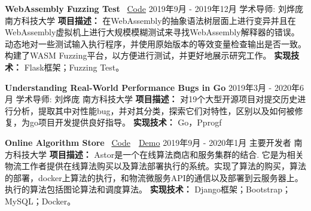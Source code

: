 \documentclass[10pt,a4paper]{article}
\begin{document}
\spacedhrule{1.6em}{-0.4em}



\headedsection
  {\textbf{WebAssembly Fuzzing Test} \faGithub~\href{https://github.com/Eveneko/WASM-Fuzzing-Platform}{Code}}
  {\textsc{2019年9月 - 2019年12月}} {%
  \prosubsection
    {学术导师: 刘烨庞}
    {南方科技大学}
    {
      \textbf{项目描述：}
      在WebAssembly的抽象语法树层面上进行变异并且在WebAssembly虚拟机上进行大规模模糊测试来寻找WebAssembly解释器的错误。动态地对一些测试输入执行程序，并使用原始版本的等效变量检查输出是否一致。构建了WASM Fuzzing平台，以方便进行测试，并更好地展示研究工作。
    }
    {
      \textbf{实现技术：}
      Flask框架；Fuzzing Test。
    }
}

\headedsection
  {\textbf{Understanding Real-World Performance Bugs in Go}}
  {\textsc{2019年3月 - 2020年6月}} {%
  \prosubsection
    {学术导师: 刘烨庞}
    {南方科技大学}
    {
      \textbf{项目描述：}
      对19个大型开源项目对提交历史进行分析，提取其中对性能bug，并对其分类，探索它们对特性，区别以及如何被修复，为go项目开发提供良好指导。
    }
    {
      \textbf{实现技术：}
      Go，Pprogf
    }
}

\spacedhrule{0.5em}{-0.4em}


\headedsection
  {\textbf{Online Algorithm Store} \faGithub~\href{https://github.com/Eveneko/Astor}{Code}~\faLink~\href{https://astor.eveneko.com}{Demo}} 
  {\textsc{2019年9月 - 2020年1月}} {%
  \prosubsection
    {主要开发者}
    {南方科技大学}
    {
      \textbf{项目描述：}
      Astor是一个在线算法商店和服务集群的结合. 它是为相关物流工作者提供在线算法购买以及算法部署执行的系统。实现了算法的购买，算法的部署，docker上算法的执行，和物流微服务API的通信以及部署到云服务器上。执行的算法包括图论算法和调度算法。
    }
    {
      \textbf{实现技术：}
      Django框架；Bootstrap；MySQL；Docker。
    }
}
\end{document}
